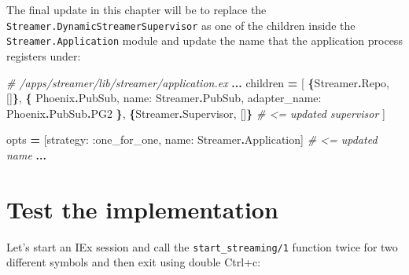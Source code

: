 \documentclass[
  oneside]{book}
\newenvironment{Shaded}{\begin{snugshade}}{\end{snugshade}}
\newcommand{\AttributeTok}[1]{\textcolor[rgb]{0.13,0.29,0.53}{#1}}
\newcommand{\CommentTok}[1]{\textcolor[rgb]{0.56,0.35,0.01}{\textit{#1}}}
\newcommand{\ConstantTok}[1]{\textcolor[rgb]{0.56,0.35,0.01}{#1}}
\newcommand{\ErrorTok}[1]{\textcolor[rgb]{0.64,0.00,0.00}{\textbf{#1}}}
\newcommand{\ExtensionTok}[1]{#1}
\newcommand{\FunctionTok}[1]{\textcolor[rgb]{0.13,0.29,0.53}{\textbf{#1}}}
\newcommand{\KeywordTok}[1]{\textcolor[rgb]{0.13,0.29,0.53}{\textbf{#1}}}
\newcommand{\NormalTok}[1]{#1}
\newcommand{\OperatorTok}[1]{\textcolor[rgb]{0.81,0.36,0.00}{\textbf{#1}}}
\newcommand{\OtherTok}[1]{\textcolor[rgb]{0.56,0.35,0.01}{#1}}
\newcommand{\PreprocessorTok}[1]{\textcolor[rgb]{0.56,0.35,0.01}{\textit{#1}}}
\newcommand{\SpecialStringTok}[1]{\textcolor[rgb]{0.31,0.60,0.02}{#1}}
\newcommand{\StringTok}[1]{\textcolor[rgb]{0.31,0.60,0.02}{#1}}
\newcommand{\VariableTok}[1]{\textcolor[rgb]{0.00,0.00,0.00}{#1}}
\begin{document}
The final update in this chapter will be to replace the \texttt{Streamer.DynamicStreamerSupervisor} as one of the children inside the \texttt{Streamer.Application} module and update the name that the application process registers under:

\begin{Shaded}
\begin{Highlighting}[]
\CommentTok{\# /apps/streamer/lib/streamer/application.ex}
    \OperatorTok{...}
\NormalTok{    children }\OperatorTok{=} \OtherTok{[}
      \FunctionTok{\{}\ConstantTok{Streamer}\OperatorTok{.}\ConstantTok{Repo}\NormalTok{, }\OtherTok{[]}\FunctionTok{\}}\NormalTok{,}
      \FunctionTok{\{}
        \ConstantTok{Phoenix}\OperatorTok{.}\ConstantTok{PubSub}\NormalTok{,}
        \VariableTok{name:} \ConstantTok{Streamer}\OperatorTok{.}\ConstantTok{PubSub}\NormalTok{, }\VariableTok{adapter\_name:} \ConstantTok{Phoenix}\OperatorTok{.}\ConstantTok{PubSub}\OperatorTok{.}\ConstantTok{PG2}
      \FunctionTok{\}}\NormalTok{,}
      \FunctionTok{\{}\ConstantTok{Streamer}\OperatorTok{.}\ConstantTok{Supervisor}\NormalTok{, }\OtherTok{[]}\FunctionTok{\}} \CommentTok{\# \textless{}= updated supervisor}
    \OtherTok{]}

\NormalTok{    opts }\OperatorTok{=} \OtherTok{[}\VariableTok{strategy:} \VariableTok{:one\_for\_one}\NormalTok{, }\VariableTok{name:} \ConstantTok{Streamer}\OperatorTok{.}\ConstantTok{Application}\OtherTok{]} \CommentTok{\# \textless{}= updated name}
    \OperatorTok{...}
\end{Highlighting}
\end{Shaded}

\section{Test the implementation}\label{test-the-implementation-3}

Let's start an IEx session and call the \texttt{start\_streaming/1} function twice for two different symbols and then exit using double Ctrl+c:

\begin{Shaded}
\end{Shaded}
\end{document}
